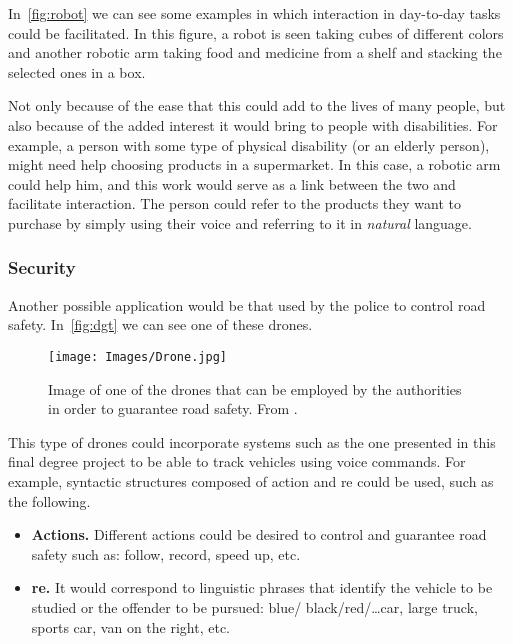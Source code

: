 In\ \vref{fig:robot} we can see some examples in which interaction in day-to-day
tasks could be facilitated. In this figure, a robot is seen taking cubes of
different colors and another robotic arm taking food and medicine from a shelf
and stacking the selected ones in a box.

Not only because of the ease that this could add to the lives of many people,
but also because of the added interest it would bring to people with
disabilities. For example, a person with some type of physical disability (or
an elderly person), might need help choosing products in a supermarket. In this
case, a robotic arm could help him, and this work would serve as a link between
the two and facilitate interaction. The person could refer to the products they
want to purchase by simply using their voice and referring to it in
\emph{natural} language.

\subsubsection{Security}

Another possible application would be that used by the police to control road
safety. In\ \vref{fig:dgt} we can see one of these drones.

\begin{figure}[ht]
  \centering
  \texttt{[image: Images/Drone.jpg]}
  \caption[Drones employed for road safety]{Image of one of the drones that can
    be employed by the authorities in order to guarantee road safety. From
    .}%
  \label{fig:dgt}
\end{figure}

This type of drones could incorporate systems such as the one presented in this
final degree project to be able to track vehicles using voice commands. For
example, syntactic structures composed of action and \gls{re} could be used,
such as the following.

\begin{itemize}
  \item \textbf{Actions.} Different actions could be desired to control and
  guarantee road safety such as: follow, record, speed up, etc.
  \item \textbf{\gls{re}.} It would correspond to linguistic phrases that
  identify the vehicle to be studied or the offender to be pursued: blue/
  black/red/\ldots car, large truck, sports car, van on the right, etc.
\end{itemize}

